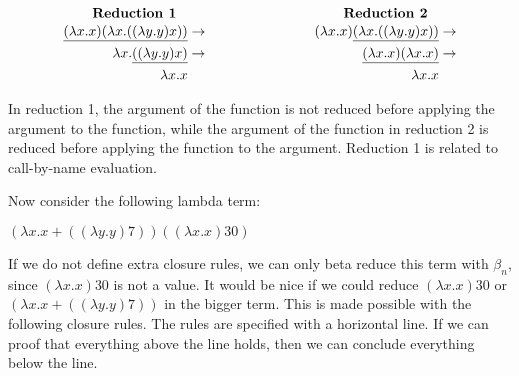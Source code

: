 \[
	\begin{array}{c c}
		\parbox[c]{0.5\textwidth}{\centering \textbf{Reduction 1}} & \parbox[c]{0.5\textwidth}{\centering \textbf{Reduction 2}} \\
		\vspace{-10pt}                                                                                                          \\
		\begin{aligned}
			\underline{(\lambda x. x)(\lambda x. ((\lambda y. y) x))} & \rightarrow \\
			\lambda x. \underline{((\lambda y. y) x)}                 & \rightarrow \\
			\lambda x. x
		\end{aligned}
		                                                           &
		\begin{aligned}
			(\lambda x. x)\underline{(\lambda x. ((\lambda y. y) x))} & \rightarrow \\
			\underline{(\lambda x. x)(\lambda x. x)}                  & \rightarrow \\
			\lambda x. x
		\end{aligned}
	\end{array}
\]

\vspace{10pt}
In reduction 1, the argument of the function is not reduced before applying the argument to the function, while the argument of the function in reduction 2 is reduced before applying the function to the argument.
Reduction 1 is related to call-by-name evaluation.

\vspace{10pt}

Now consider the following lambda term:

\vspace{10pt}
$(\lambda x. x + ((\lambda y.y)7)) ((\lambda x.x)30)$

\vspace{10pt}
If we do not define extra closure rules, we can only beta reduce this term with $\beta_n$, since $(\lambda x. x) 30$ is not a value.
It would be nice if we could reduce $(\lambda x. x) 30$ or $(\lambda x. x + ((\lambda y.y)7))$ in the bigger term.
This is made possible with the following closure rules. The rules are specified with a horizontal line.
If we can proof that everything above the line holds, then we can conclude everything below the line.

